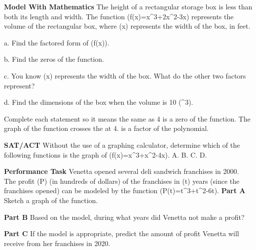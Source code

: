 \documentclass{article}
\newenvironment{practice}[2]{}{}        %
\newcommand{\answer}[1]{}               %
\newcommand{\placeholder}[2]{}          %
\newcommand{\te}[1]{}                   %
\begin{document}
\begin{practice}{27}{3}
\textbf{Model With Mathematics} The height of a rectangular storage box is less than both its length and width. The function (f(x)=x^3+2x^2-3x) represents the volume of the rectangular box, where (x) represents the width of the box, in feet.
\placeholder{illustration}{Rectangular metal storage box in a pickup truck bed; horizontal arrow across its front labeled x.}
a. Find the factored form of (f(x)).
\answer{(x(x^2+2x-3)=x(x+3)(x-1))}
b. Find the zeros of the function.
\answer{The zeros are (x=0), (x=-3), and (x=1).}
c. You know (x) represents the width of the box. What do the other two factors represent?
\answer{((x-1)) represents the height, and ((x+3)) represents the length.}
d. Find the dimensions of the box when the volume is 10 (^3).
\answer{width = 2 ft, height = 1 ft, and length = 5 ft.}
\end{practice}
\begin{practice}{28}{1}
Complete each statement so it means the same as 4 is a zero of the function.
The graph of the function crosses the \underline{\hspace{1cm}} at 4. \underline{\hspace{1cm}} is a factor of the polynomial.
\answer{(x)-axis; ((x-4))}
\te{The printed statement says crosses; a zero of even multiplicity may only touch the axis.}
\end{practice}
\begin{practice}{29}{1}
\textbf{SAT/ACT} Without the use of a graphing calculator, determine which of the following functions is the graph of (f(x)=x^3+x^2-4x).
A. \placeholder{graph}{Upward red parabola, minimum near (-0.5,-2.3); x labels -2,O,2; y labels 4,2,-2.}
B. \placeholder{graph}{Downward red parabola, vertex near (2.5,0.3); x labels -2,O,2,4; y labels 2,-2,-4.}
C. \placeholder{graph}{Red cubic, left end down and right end up; crosses at roughly -2.56,0,1.56; x labels -2,O,2,4; y labels 4,2,-2.}
D. \placeholder{graph}{Red cubic, left end up and right end down; minimum near (-1.5,-5) and maximum near (0.5,2); x labels -2,O,2; y labels 2,-2,-4.}
\answer{C}
\end{practice}
\begin{practice}{30}{3}
\textbf{Performance Task} Venetta opened several deli sandwich franchises in 2000. The profit (P) (in hundreds of dollars) of the franchises in (t) years (since the franchises opened) can be modeled by the function (P(t)=t^3+t^2-6t).
\textbf{Part A} Sketch a graph of the function.
\placeholder{graph}{Printed answer: red increasing cubic for nonnegative time, nearly flat near the origin and rising steeply; x labels O,6,12,18,24, y labels 4000,8000,12000,16000.}
\answer{See graph.}
\textbf{Part B} Based on the model, during what years did Venetta not make a profit?
\answer{Venetta did not make a profit during the first two years.}
\textbf{Part C} If the model is appropriate, predict the amount of profit Venetta will receive from her franchises in 2020.
\answer{The predicted amount of profit for 2020 is \$828,000.}
\end{practice}
\end{document}
